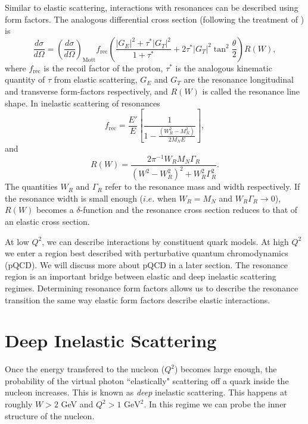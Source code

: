 Similar to elastic scattering, interactions with resonances can be described using form factors. The analogous differential cross section (following the treatment of \cite{stoler}) is
\begin{equation}
\frac{d\sigma}{d\Omega} = \left( \frac{d\sigma}{d\Omega} \right)_{\mathrm{Mott}} f_{\mathrm{rec}} \left( \frac{|G_E|^2+\tau^*|G_T|^2}{1+\tau^*} + 2\tau^* |G_T|^2 \tan^2 \frac{\theta}{2} \right) R(W),
\end{equation}
where $f_{\mathrm{rec}}$ is the recoil factor of the proton, $\tau^*$ is the analogous kinematic quantity of $\tau$ from elastic scattering, $G_E$ and $G_T$ are the resonance longitudinal and transverse form-factors respectively, and $R(W)$ is called the resonance line shape. In inelastic scattering of resonances
\begin{equation}
f_{\mathrm{rec}} = \frac{E'}{E} \left[ \frac{1}{1-\frac{(W_R^2 - M_N^2)}{2M_NE}} \right],
\end{equation}
and
\begin{equation}
R(W) = \frac{2\pi^{-1}W_R M_N \Gamma_R}{(W^2-W_R^2)^2 + W_R^2 \Gamma_R^2}.
\end{equation}
The quantities $W_R$ and $\Gamma_R$ refer to the resonance mass and width respectively. If the resonance width is small enough ($i.e.$ when $W_R=M_N$ and $W_R \Gamma_R \rightarrow 0$), $R(W)$ becomes a $\delta$-function and the resonance cross section reduces to that of an elastic cross section. 

At low $Q^2$, we can describe interactions by constituent quark models. At high $Q^2$ we enter a region best described with perturbative quantum chromodynamics (pQCD). We will discuss more about pQCD in a later section. The resonance region is an important bridge between elastic and deep inelastic scattering regimes. Determining resonance form factors allows us to describe the resonance transition the same way elastic form factors describe elastic interactions.

\section{Deep Inelastic Scattering}
Once the energy transfered to the nucleon ($Q^2$) becomes large enough, the probability of the virtual photon ``elastically" scattering off a quark inside the nucleon increases. This is known as \textit{deep} inelastic scattering. This happens at roughly $W > 2$ GeV and $Q^2 > 1$ $\mathrm{GeV}^2$. In this regime we can probe the inner structure of the nucleon. 

